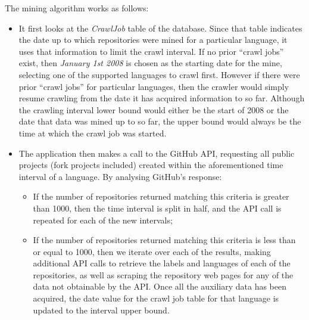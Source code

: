 The mining algorithm works as follows:
\begin{itemize}
    \item It first looks at the \textit{CrawlJob} table of the database. Since that table indicates the date up to which repositories were mined for a particular language, it uses that information to limit the crawl interval. If no prior ``crawl jobs'' exist, then \textit{January 1st 2008} is chosen as the starting date for the mine, selecting one of the supported languages to crawl first. However if there were prior ``crawl jobs'' for particular languages, then the crawler would simply resume crawling from the date it has acquired information to so far. Although the crawling interval lower bound would either be the start of 2008 or the date that data was mined up to so far, the upper bound would always be the time at which the crawl job was started.
    \item The application then makes a call to the GitHub API, requesting all public projects (fork projects included) created within the aforementioned time interval of a language. By analysing GitHub's response:
    \begin{itemize}
        \item If the number of repositories returned matching this criteria is greater than 1000, then the time interval is split in half, and the API call is repeated for each of the new intervals;
        \item If the number of repositories returned matching this criteria is less than or equal to 1000, then we iterate over each of the results, making additional API calls to retrieve the labels and languages of each of the repositories, as well as scraping the repository web pages for any of the data not obtainable by the API\@. Once all the auxiliary data has been acquired, the date value for the crawl job table for that language is updated to the interval upper bound.
    \end{itemize}
\end{itemize}